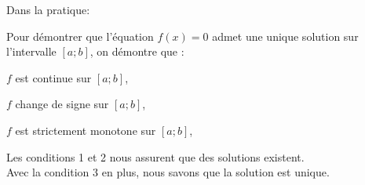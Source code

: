 \begin{bmanip}
	Dans la pratique:
	
	Pour démontrer que l'équation \(f(x)=0\) admet une unique solution sur l'intervalle \([a ; b]\), on démontre que :
	
	\begin{enumMet}
		\item \(f\) est continue sur \([a ; b]\),
		\item \(f\) change de signe sur \([a ; b]\),
		\item \(f\) est strictement monotone sur \([a ; b]\),
	\end{enumMet}
	
	Les conditions 1 et 2 nous assurent que des solutions existent.\\
	Avec la condition 3 en plus, nous savons que la solution est unique.
	
\end{bmanip}

